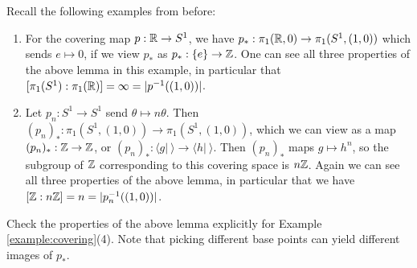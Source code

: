 \begin{example}
  Recall the following examples from before:
  \begin{enumerate}
    \item For the covering map $p : \mathbb{R} \to S^1$, we
      have $p_* : \pi_1(\mathbb{R}, 0) \to \pi_1(S^1, (1, 0))$
      which sends $e \mapsto 0$, if we view
      $p_*$ as $p_* : \{e\} \to \mathbb{Z}$. One can see
      all three properties of the above lemma in this
      example, in
      particular that
      $[\pi_1(S^1) : \pi_1(\mathbb{R})] = \infty = |p^{-1}((1, 0))|$.
    \item Let $p_n : S^1 \to S^1$
      send $\theta \mapsto n\theta$. Then
      $(p_n)_* : \pi_1(S^1, (1, 0)) \to \pi_1(S^1, (1, 0))$, which we can view
      as a map $(p_n)_* : \mathbb{Z} \to \mathbb{Z}$, or $(p_n)_* : \langle g | \ \rangle \to \langle h | \ \rangle$.
      Then $(p_n)_*$ maps $g \mapsto h^n$, so the subgroup
      of $\mathbb{Z}$ corresponding to this covering space
      is $n\mathbb{Z}$. Again we can see all three properties
      of the above lemma, in particular that
      we have $[\mathbb{Z} : n\mathbb{Z}] = n = |p_n^{-1}((1, 0))|$.
  \end{enumerate}
\end{example}

\begin{exercise}
  Check the properties of the above lemma explicitly
  for Example \ref{example:covering}(4). Note that
  picking different base points can yield different
  images of $p_*$.
\end{exercise}
